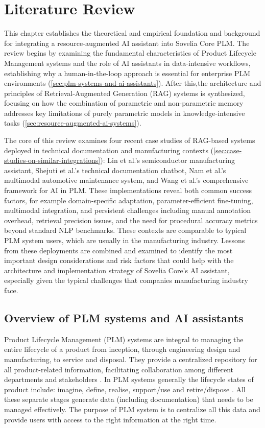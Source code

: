 \chapter{Literature Review}
\label{ch:literature-review}

This chapter establishes the theoretical and empirical foundation and background for integrating a resource-augmented AI assistant into Sovelia Core PLM. The review begins by examining the fundamental characteristics of Product Lifecycle Management systems and the role of AI assistants in data-intensive workflows, establishing why a human-in-the-loop approach is essential for enterprise PLM environments (\autoref{sec:plm-systems-and-ai-assistants}). After this,the architecture and principles of Retrieval-Augmented Generation (RAG) systems is synthesized, focusing on how the combination of parametric and non-parametric memory addresses key limitations of purely parametric models in knowledge-intensive tasks (\autoref{sec:resource-augmented-ai-systems}).

The core of this review examines four recent case studies of RAG-based systems deployed in technical documentation and manufacturing contexts (\autoref{sec:case-studies-on-similar-integrations}): Lin et al.'s semiconductor manufacturing assistant, Shejuti et al.'s technical documentation chatbot, Nam et al.'s multimodal automotive maintenance system, and Wang et al.'s comprehensive framework for AI in PLM. These implementations reveal both common success factors, for example domain-specific adaptation, parameter-efficient fine-tuning, multimodal integration, and persistent challenges including manual annotation overhead, retrieval precision issues, and the need for procedural accuracy metrics beyond standard NLP benchmarks. These contexts are comparable to typical PLM system users, which are usually in the manufacturing industry.\parencite{stark_product_2015} Lessons from these deployments are combined and examined to identify the most important design considerations and risk factors that could help with the architecture and implementation strategy of Sovelia Core's AI assistant, especially given the typical challenges that companies manufacturing industry face.

\section{Overview of PLM systems and AI assistants}
\label{sec:plm-systems-and-ai-assistants}

Product Lifecycle Management (PLM) systems are integral to managing the entire lifecycle of a product from inception, through engineering design and manufacturing, to service and disposal. They provide a centralized repository for all product-related information, facilitating collaboration among different departments and stakeholders \parencite{stark_product_2015}. In PLM systems generally the lifecycle states of product include: imagine, define, realise, support/use and retire/dispose \parencite{stark_product_2015-1}. All these separate stages generate data (including documentation) that needs to be managed effectively. The purpose of PLM system is to centralize all this data and provide users with access to the right information at the right time.

